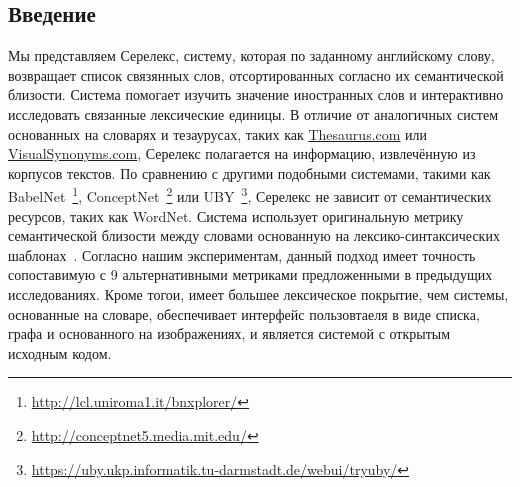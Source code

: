 \documentclass[a4paper,10pt,twoside]{article}
\begin{document}

\author{Панченко А.И.${}^{1,2}$, Романов П.В.${}^2$, Романов А.В${}^1$, \linebreak Филиппович А.Ю.${}^2$, Филиппович Ю.Н.${}^2$, Морозова О.Д.${}^1$}




\subsection{Введение}

Мы представляем Серелекс, систему, которая по заданному английскому слову, возвращает список связянных слов, отсортированных согласно их семантической близости. Система помогает изучить значение иностранных слов и интерактивно исследовать связанные лексические единицы. В отличие от аналогичных систем основанных на словарях и тезаурусах, таких как \url{Thesaurus.com} или \url{VisualSynonyms.com}, Серелекс полагается на информацию, извлечённую из корпусов текстов. По сравнению с другими подобными системами, такими как BabelNet~\footnote{ \url{http://lcl.uniroma1.it/bnxplorer/}}, ConceptNet~\footnote{ \url{http://conceptnet5.media.mit.edu/}} или UBY~\footnote{\url{https://uby.ukp.informatik.tu-darmstadt.de/webui/tryuby/}}, Серелекс не зависит от семантических ресурсов, таких как WordNet. Система использует оригинальную метрику семантической близости между словами основанную на лексико-синтаксических шаблонах~\cite{panchenko2012konvens}. Согласно нашим экспериментам, данный подход имеет точность сопоставимую с 9 альтернативными метриками предложенными в предыдущих исследованиях. Кроме тогои, имеет большее лексическое покрытие, чем системы, основанные на словаре, обеспечивает интерфейс 
пользовтаеля в виде списка, графа и основанного на изображениях, и является системой с открытым исходным кодом.
\end{document}
